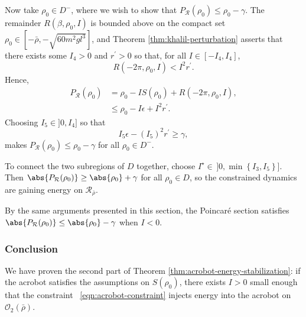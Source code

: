 Now take \(\rho_0 \in D^-\), where we wish to show that 
\(P_\mathcal{R}(\rho_0) \leq \rho_0 - \gamma\).
The remainder \(R(\beta,\rho_0,I)\) is bounded above on the compact set 
\(\rho_0 \in \left[-\bar{\rho},-\sqrt{60m^2gl^3}\right]\), and 
Theorem \ref{thm:khalil-perturbation} asserts that there exists some 
\(I_4 > 0\) and \(r^\prime > 0\) so that, for all \(I \in [-I_4,I_4]\), 
\[
    R(-2\pi,\rho_0,I) < I^2 r^\prime
    .
\]
Hence,
\begin{align*}
    P_\mathcal{R}(\rho_0)
    &= \rho_0 - IS(\rho_0) + R(-2\pi,\rho_0,I)
    , \\
    &\leq \rho_0 - I\epsilon + I^2r^\prime
    .
\end{align*}
Choosing \(I_5 \in ]0,I_4]\) so that 
\[
    I_5 \epsilon - (I_5)^2r^\prime \geq \gamma
    ,
\] 
makes \(P_\mathcal{R}(\rho_0) \leq \rho_0 - \gamma\) for all 
\(\rho_0 \in D^-\).

To connect the two subregions of \(D\) together, choose
\(I^\star \in\, ]0,\min\left\{I_3,I_5\right\}]\).
Then \(\abs{P_\mathcal{R}(\rho_0)} \geq \abs{\rho_0} + \gamma\) for all
\(\rho_0 \in D\), so the constrained dynamics are gaining energy on 
\(\mathcal{R}_{\bar{\rho}}\).

By the same arguments presented in this section, the Poincar\'{e} section
satisfies \(\abs{P_\mathcal{R}(\rho_0)} \leq \abs{\rho_0} - \gamma\) 
when \(I < 0\).

\subsubsection*{Conclusion}
We have proven the second part of Theorem
\ref{thm:acrobot-energy-stabilization}: if the acrobot satisfies the assumptions
on \(S(\rho_0)\), there exists \(I > 0\) small enough that the constraint
~\eqref{eqn:acrobot-constraint} injects energy into the acrobot on
\(\mathcal{O}_2(\bar{\rho})\).

